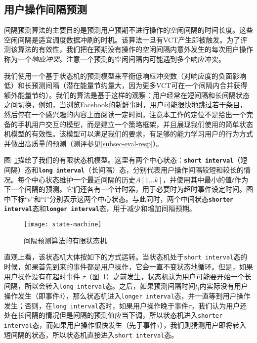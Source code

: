 \subsection{用户操作间隔预测}
\label{subsec:interval}

间隔预测算法的主要目的是预测用户预期不进行操作的空闲间隔的时间长度。这些空闲间隔是适宜调度数据冲刷的时机。该算法一旦有VCT产生即被触发。为了评测该算法的有效性，我们把在预期没有操作的空闲间隔内意外发生的每次用户操作称为一个\emph{响应冲突}。注意一个预测的空闲间隔内可能遇到多个响应冲突。 
 
我们使用一个基于状态机的预测模型来平衡低响应冲突数（对响应度的负面影响低）和长预测间隔（潜在能量节约量大，因为更多VCT可在一个间隔内合并获得额外能量节约）。我们的算法是基于这样的观察：用户经常在短间隔和长间隔状态之间切换，例如，当浏览Facebook的新鲜事时，用户可能很快地跳过若干条目，然后停在一个感兴趣的内容上面阅读一定时间。注意本工作的定位不是给出一个完备的手机用户交互的模型，而是建立一个策略框架，并且展现我们使用的简单状态机模型的有效性。该模型可以满足我们的要求，有足够的能力学习用户的行为方式并做出高质量的预测（测评参见\ref{subsec-eval-resp}）。

图~\ref{fig-state-machine}描绘了我们的有限状态机模型。这里有两个中心状态：\textbf{\texttt{short interval}}（短间隔）态和\texttt{\textbf{long interval}}（长间隔）态，分别代表用户操作间隔较短和较长的情况。每个中心状态维护一个最近间隔的历史$A[1\ldots k]$，并使用其中最小的值$t$作为下一个间隔的预测。它们还各有一个计时器，用于必要时为超时事件设定时间。图中下标“s”和“l”分别表示这两个中心状态。与此同时，两个中间状态\texttt{\textbf{shorter interval}}态和\texttt{\textbf{longer
interval}}态，用于减少和增加间隔预期。

\begin{figure}[!h]
  \centering
  \texttt{[image: state-machine]}
  \caption{间隔预测算法的有限状态机}
  \label{fig-state-machine}
\end{figure}

直观上看，该状态机大体按如下的方式运转。当状态机处于\texttt{short interval}态的时候，如果首先到来的事件都是用户操作，它会一直不变状态地循环。但是，如果用户操作没有在超时事件
$\tau$（图~\ref{fig-state-machine}）之前发生，状态机认为用户可能要开始一个长间隔，所以会转入\texttt{long interval}态。之后，如果预测间隔时间$t_l$内实际没有用户操作发生（即事件$\delta$），那么状态机进入\texttt{longer interval}态，并一直等到用户操作发生；否则，在\texttt{long interval}态时，如果用户操作晚于事件$\tau$，我们认为用户还处在长间隔的情况但是间隔的预测值应当下调，所以状态机进入\texttt{shorter interval}态，而如果用户操作很快发生（先于事件$\tau$），我们则猜测用户即将转入短间隔的状态，所以状态机直接进入\texttt{short interval}态。


